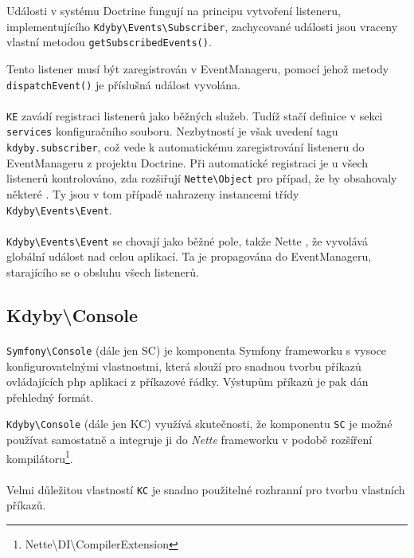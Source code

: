 \documentclass[11pt,oneside]{fithesis}
\begin{document}
        Události v systému Doctrine fungují na principu vytvoření listeneru, implementujícího \verb|Kdyby\Events\Subscriber|, zachycované události jsou vraceny vlastní metodou \verb|getSubscribedEvents()|.

        Tento listener musí být zaregistrován v EventManageru, pomocí jehož metody \verb|dispatchEvent()| je příslušná událost vyvolána.

        \paragraph*{}
        \verb|KE| zavádí registraci listenerů jako běžných služeb. Tudíž stačí definice v sekci \verb|services|  konfiguračního souboru. Nezbytností je však uvedení tagu \verb|kdyby.subscriber|, což vede k automatickému zaregistrování listeneru do EventManageru z projektu Doctrine. Při automatické registraci je u všech listenerů kontrolováno, zda rozšiřují \verb|Nette\Object| pro případ, že by obsahovaly některé . Ty jsou v tom případě nahrazeny instancemi třídy \verb|Kdyby\Events\Event|. 
        \paragraph*{}
        \verb|Kdyby\Events\Event| se chovají jako běžné pole, takže Nette , že vyvolává globální událost nad celou aplikací. Ta je propagována do EventManageru, starajícího se o obsluhu všech listenerů.

        \subsection{Kdyby\textbackslash Console}
        \paragraph*{}
        \verb|Symfony\Console| (dále jen SC) je komponenta Symfony frameworku\cite{symfony} s vysoce konfigurovatelnými vlastnostmi, která slouží pro snadnou tvorbu příkazů ovládajících php aplikaci z příkazové řádky. Výstupům příkazů je pak dán přehledný formát.  

        \verb|Kdyby\Console| (dále jen KC) využívá skutečnosti, že komponentu \verb|SC| je možné používat samostatně a integruje ji do \textit{Nette} frameworku v podobě rozšíření kompilátoru\footnote{Nette\textbackslash DI\textbackslash CompilerExtension}.
        \paragraph*{}
        Velmi důležitou vlastností \verb|KC| je snadno použitelné rozhranní pro tvorbu vlastních příkazů.
\end{document}
